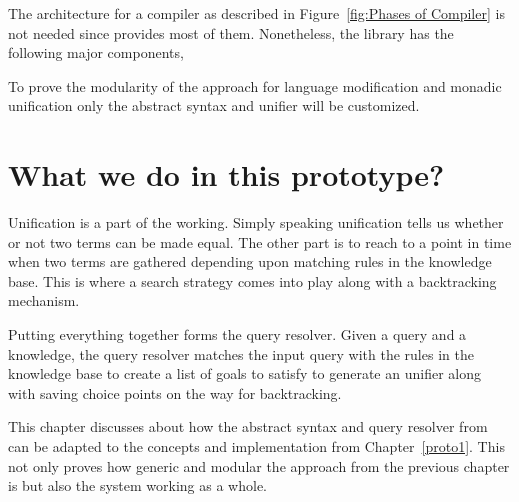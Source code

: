 \documentclass[thesis-solanki.tex]{subfiles}
\begin{document}
The architecture for a compiler as described in Figure~\ref{fig:Phases of Compiler} is not needed since
 provides most of them.
Nonetheless, the library has the following major components,


To prove the modularity of the approach for language modification and monadic unification only the abstract syntax
and unifier will be customized.



\section{What we do in this prototype?}



Unification is a part of the  working.
Simply speaking unification tells us whether or not two terms can be made equal.
The other part is to reach to a point in time when two terms are gathered depending upon matching rules in the
knowledge base.
This is where a search strategy comes into play along with a backtracking mechanism.

Putting everything together forms the  query resolver.
Given a query and a knowledge, the query resolver matches the input query with the rules in the knowledge base to
create a list of goals to satisfy to generate an unifier along with saving choice points on the way for
backtracking.

This chapter discusses about how the abstract syntax and query resolver from \cite{prolog-lib} can be adapted to
the concepts and implementation from Chapter~\ref{proto1}.
This not only proves how generic and modular the approach from the previous chapter is but also the system working
as a whole.
\end{document}
